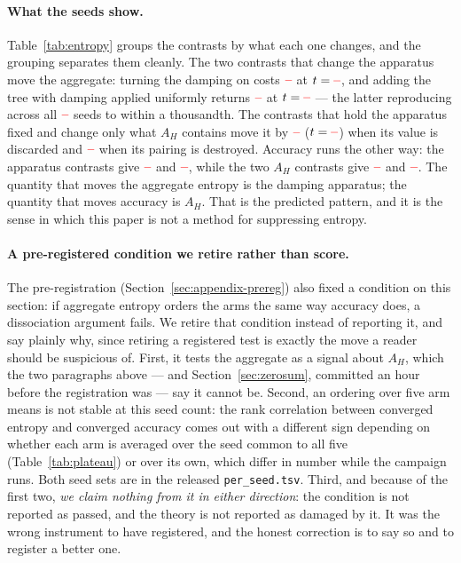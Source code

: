 \documentclass[11pt]{article}
\newcommand{\AH}{A_{H}}
\providecommand{\PENDING}{\textcolor{red}{\textbf{--}}}
\newcommand{\num}[1]{\ifcsname #1\endcsname\csname #1\endcsname\else\PENDING\fi}
\begin{document}
\paragraph{What the seeds show.} Table~\ref{tab:entropy} groups the contrasts by
what each one changes, and the grouping separates them cleanly. The two contrasts
that change the apparatus move the aggregate: turning the damping on costs
$\num{Csteergrpoentropy}$ at $t = \num{Tsteergrpoentropy}$, and adding the tree with
damping applied uniformly returns $\num{Cuniformsteerentropy}$ at
$t = \num{Tuniformsteerentropy}$ --- the latter reproducing across all
$\num{Nseedsused}$ seeds to within a thousandth. The contrasts that hold the
apparatus fixed and change only what $\AH$ contains move it by
$\num{Csigneduniformentropy}$ ($t = \num{Tsigneduniformentropy}$) when its value is
discarded and $\num{Csignedpermutedentropy}$ when its pairing is destroyed. Accuracy
runs the other way: the apparatus contrasts give $\num{Cuniformsteeracc}$ and
$\num{Csteergrpoacc}$, while the two $\AH$ contrasts give $\num{Csigneduniformacc}$
and $\num{Csignedpermutedacc}$. The quantity that moves the aggregate entropy is the
damping apparatus; the quantity that moves accuracy is $\AH$. That is the predicted
pattern, and it is the sense in which this paper is not a method for suppressing
entropy.

\paragraph{A pre-registered condition we retire rather than score.} The
pre-registration (Section~\ref{sec:appendix-prereg}) also fixed a condition on this
section: if aggregate entropy orders the arms the same way accuracy does, a
dissociation argument fails. We retire that condition instead of reporting it,
and say plainly why, since retiring a registered test is exactly the move a reader
should be suspicious of. First, it tests the aggregate as a signal about $\AH$,
which the two paragraphs above --- and Section~\ref{sec:zerosum}, committed an hour
before the registration was --- say it cannot be. Second, an ordering over five arm
means is not stable at this seed count: the rank correlation between converged
entropy and converged accuracy comes out with a different sign depending on whether
each arm is averaged over the seed common to all five (Table~\ref{tab:plateau}) or
over its own, which differ in number while the campaign runs. Both seed sets are in
the released \texttt{per\_seed.tsv}. Third, and because of the first two, \emph{we
claim nothing from it in either direction}: the condition is not reported as passed,
and the theory is not reported as damaged by it. It was the wrong instrument to have
registered, and the honest correction is to say so and to register a better one.
\end{document}
